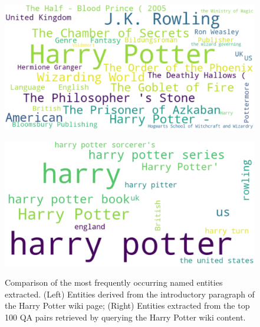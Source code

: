\documentclass[11pt]{article}
\begin{document}
\begin{figure}[h]
  \centering
  \begin{minipage}{.5\textwidth}
    \centering
    \includegraphics[width=.85\linewidth]{submissions/Tung2023/figs/hp_context_wordcloud.png}
    \label{fig:wordcloud1}
  \end{minipage}%
  \begin{minipage}{.5\textwidth}
    \centering
    \includegraphics[width=.85\linewidth]{submissions/Tung2023/figs/hp_qa_wordcloud.png}
    \label{fig:wordcloud2}
  \end{minipage}
  \caption[Short Caption for LoF]{Comparison of the most frequently occurring named entities extracted. (Left) Entities derived from the introductory paragraph of the Harry Potter wiki page; (Right) Entities extracted from the top 100 QA pairs retrieved by querying the Harry Potter wiki content.}
  \label{fig:hp_example}
\end{figure}

\end{document}
